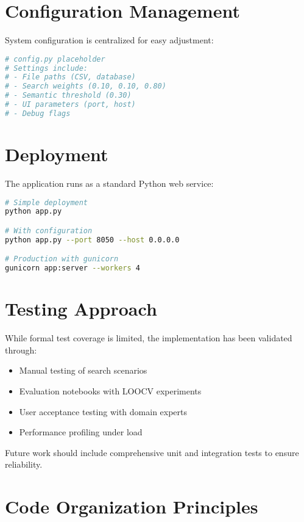 \section{Configuration Management}

System configuration is centralized for easy adjustment:

\begin{lstlisting}[language=Python, caption={Configuration structure}, label={lst:config}]
# config.py placeholder
# Settings include:
# - File paths (CSV, database)
# - Search weights (0.10, 0.10, 0.80)
# - Semantic threshold (0.30)
# - UI parameters (port, host)
# - Debug flags
\end{lstlisting}

\section{Deployment}

The application runs as a standard Python web service:

\begin{lstlisting}[language=bash, caption={Starting the application}, label={lst:deployment}]
# Simple deployment
python app.py

# With configuration
python app.py --port 8050 --host 0.0.0.0

# Production with gunicorn
gunicorn app:server --workers 4
\end{lstlisting}

\section{Testing Approach}

While formal test coverage is limited, the implementation has been validated through:

\begin{itemize}[leftmargin=*,itemsep=2pt,topsep=2pt]
 \item Manual testing of search scenarios
 \item Evaluation notebooks with LOOCV experiments
 \item User acceptance testing with domain experts
 \item Performance profiling under load
\end{itemize}

Future work should include comprehensive unit and integration tests to ensure reliability.

\section{Code Organization Principles}

